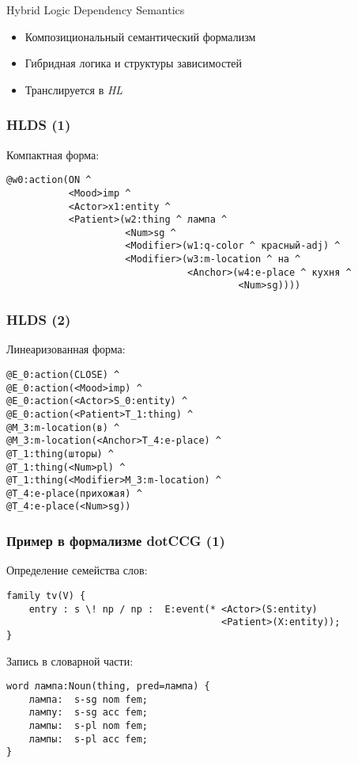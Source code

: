 \documentclass{beamer}
\begin{document}
\begin{frame}{Hybrid Logic Dependency Semantics}
\begin{itemize}
	\item Композициональный семантический формализм
	\item Гибридная логика и структуры зависимостей
	\item Транслируется в \textit{HL}
\end{itemize}
\end{frame}

\begin{frame}[fragile]
\frametitle{HLDS (1)}
Компактная форма:
{\footnotesize \begin{verbatim}
@w0:action(ON ^
           <Mood>imp ^
           <Actor>x1:entity ^
           <Patient>(w2:thing ^ лампа ^
                     <Num>sg ^
                     <Modifier>(w1:q-color ^ красный-adj) ^
                     <Modifier>(w3:m-location ^ на ^
                                <Anchor>(w4:e-place ^ кухня ^
                                         <Num>sg))))
\end{verbatim}}
\end{frame}

\begin{frame}[fragile]
\frametitle{HLDS (2)}
Линеаризованная форма:
{\footnotesize \begin{verbatim}
@E_0:action(CLOSE) ^ 
@E_0:action(<Mood>imp) ^
@E_0:action(<Actor>S_0:entity) ^ 
@E_0:action(<Patient>T_1:thing) ^ 
@M_3:m-location(в) ^ 
@M_3:m-location(<Anchor>T_4:e-place) ^ 
@T_1:thing(шторы) ^ 
@T_1:thing(<Num>pl) ^ 
@T_1:thing(<Modifier>M_3:m-location) ^ 
@T_4:e-place(прихожая) ^ 
@T_4:e-place(<Num>sg))
\end{verbatim}}
\end{frame}

\begin{frame}[fragile]
\frametitle{Пример в формализме dotCCG (1)}
Определение семейства слов:
{\footnotesize \begin{verbatim}
family tv(V) {
    entry : s \! np / np : 	E:event(* <Actor>(S:entity) 
                                      <Patient>(X:entity));
}
\end{verbatim}}
\bigskip
\bigskip
Запись в словарной части:
{\footnotesize \begin{verbatim}
word лампа:Noun(thing, pred=лампа) {
    лампа:  s-sg nom fem;
    лампу:  s-sg acc fem;
    лампы:  s-pl nom fem;
    лампы:  s-pl acc fem;
}
\end{verbatim}}
\end{frame}
\end{document}
